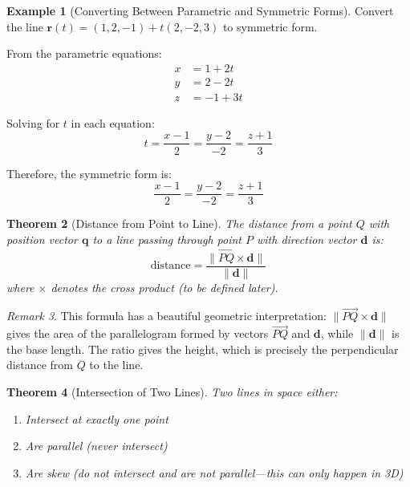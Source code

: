 \documentclass[12pt]{article}
\numberwithin{equation}{section}
\newcommand{\vect}[1]{\boldsymbol{#1}}   %
\theoremstyle{plain}
\newtheorem{theorem}{Theorem}[section]
\theoremstyle{definition}
\newtheorem{example}[theorem]{Example}
\theoremstyle{remark}
\newtheorem{remark}[theorem]{Remark}
\begin{document}
\begin{example}[Converting Between Parametric and Symmetric Forms]
Convert the line $\vect{r}(t) = (1, 2, -1) + t(2, -2, 3)$ to symmetric form.

From the parametric equations:
\begin{align}
x &= 1 + 2t\\
y &= 2 - 2t\\
z &= -1 + 3t
\end{align}

Solving for $t$ in each equation:
$$t = \frac{x-1}{2} = \frac{y-2}{-2} = \frac{z+1}{3}$$

Therefore, the symmetric form is:
$$\frac{x-1}{2} = \frac{y-2}{-2} = \frac{z+1}{3}$$
\end{example}

\begin{theorem}[Distance from Point to Line]
The distance from a point $Q$ with position vector $\vect{q}$ to a line passing through point $P$ with direction vector $\vect{d}$ is:
$$\text{distance} = \frac{\|\overrightarrow{PQ} \times \vect{d}\|}{\|\vect{d}\|}$$
where $\times$ denotes the cross product (to be defined later).
\end{theorem}

\begin{remark}
This formula has a beautiful geometric interpretation: $\|\overrightarrow{PQ} \times \vect{d}\|$ gives the area of the parallelogram formed by vectors $\overrightarrow{PQ}$ and $\vect{d}$, while $\|\vect{d}\|$ is the base length. The ratio gives the height, which is precisely the perpendicular distance from $Q$ to the line.
\end{remark}

\begin{theorem}[Intersection of Two Lines]
Two lines in space either:
\begin{enumerate}
\item Intersect at exactly one point
\item Are parallel (never intersect)
\item Are skew (do not intersect and are not parallel—this can only happen in 3D)
\end{enumerate}
\end{theorem}
\end{document}

